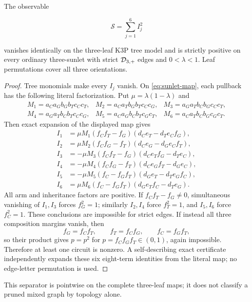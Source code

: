 \begin{proposition}\label{prop:tree-sunlet}
The observable

\[
 \mathcal S=\sum_{j=1}^6 I_j^2
\]

vanishes identically on the three-leaf K3P tree model and is strictly
positive on every ordinary three-sunlet with strict \(\mathcal D_{3,+}\) edges and
\(0<\lambda<1\).  Leaf permutations cover all three orientations.
\end{proposition}

\begin{proof}
Tree monomials make every \(I_j\) vanish.  On \eqref{eq:sunlet-map}, each
pullback has the following literal factorization.  Put
\(\mu=\lambda(1-\lambda)\) and
\[
\begin{array}{lll}
M_1=a_Ca_Gb_Gb_Tc_Cc_T,&M_2=a_Ca_Tb_Gb_Tc_Cc_G,&
M_3=a_Ga_Tb_Cb_Gc_Cc_T,\\
M_4=a_Ga_Tb_Cb_Tc_Cc_G,&M_5=a_Ca_Gb_Cb_Tc_Gc_T,&
M_6=a_Ca_Tb_Cb_Gc_Gc_T.
\end{array}
\]
Then exact expansion of the displayed map gives
\begin{align*}
I_1&=\mu M_1(f_Cf_T-f_G)(d_Ce_T-d_Te_Cf_G),\\
I_2&=\mu M_2(f_Cf_G-f_T)(d_Ce_G-d_Ge_Cf_T),\\
I_3&=-\mu M_3(f_Cf_T-f_G)(d_Ce_Tf_G-d_Te_C),\\
I_4&=-\mu M_4(f_Cf_G-f_T)(d_Ce_Gf_T-d_Ge_C),\\
I_5&=-\mu M_5(f_C-f_Gf_T)(d_Ge_T-d_Te_Gf_C),\\
I_6&=\mu M_6(f_C-f_Gf_T)(d_Ge_Tf_C-d_Te_G).
\end{align*}
All arm and inheritance factors are positive.  If
\(f_Cf_T-f_G\ne0\), simultaneous vanishing of \(I_1,I_3\) forces
\(f_G^2=1\); similarly \(I_2,I_4\) force \(f_T^2=1\), and
\(I_5,I_6\) force \(f_C^2=1\).  These conclusions are impossible for
strict edges.  If instead all three composition margins vanish, then
\[
 f_G=f_Cf_T,\qquad f_T=f_Cf_G,\qquad f_C=f_Gf_T,
\]
so their product gives \(p=p^2\) for
\(p=f_Cf_Gf_T\in(0,1)\), again impossible.  Therefore at least one circuit
is nonzero.  A self-describing exact certificate independently expands these
six eight-term identities from the literal map; no edge-letter permutation
is used.
\end{proof}

This separator is pointwise on the complete three-leaf maps; it does not
classify a pruned mixed graph by topology alone.

